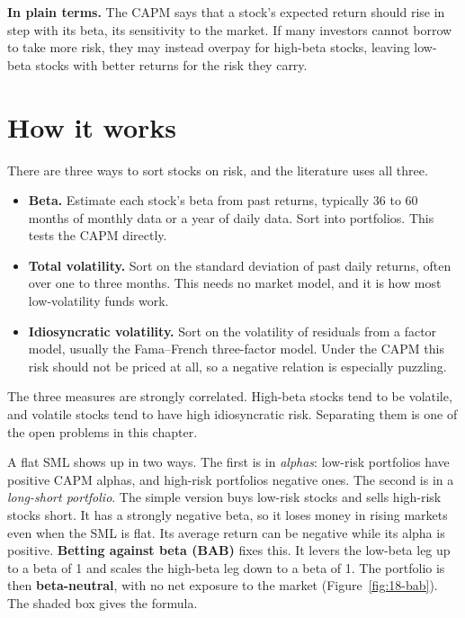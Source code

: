 \noindent\textbf{In plain terms.} The CAPM says that a stock's expected return should rise in step with its beta, its sensitivity to the market. If many investors cannot borrow to take more risk, they may instead overpay for high-beta stocks, leaving low-beta stocks with better returns for the risk they carry.

\section{How it works}
\label{sec:18-how}

There are three ways to sort stocks on risk, and the literature uses all three.

\begin{itemize}
  \item \textbf{Beta.} Estimate each stock's beta from past returns, typically 36 to 60 months of monthly data or a year of daily data. Sort into portfolios. This tests the CAPM directly.
  \item \textbf{Total volatility.} Sort on the standard deviation of past daily returns, often over one to three months. This needs no market model, and it is how most low-volatility funds work.
  \item \textbf{Idiosyncratic volatility.} Sort on the volatility of residuals from a factor model, usually the Fama--French three-factor model. Under the CAPM this risk should not be priced at all, so a negative relation is especially puzzling.
\end{itemize}

The three measures are strongly correlated. High-beta stocks tend to be volatile, and volatile stocks tend to have high idiosyncratic risk. Separating them is one of the open problems in this chapter.

A flat SML shows up in two ways. The first is in \emph{alphas}: low-risk portfolios have positive CAPM alphas, and high-risk portfolios negative ones. The second is in a \emph{long-short portfolio}. The simple version buys low-risk stocks and sells high-risk stocks short. It has a strongly negative beta, so it loses money in rising markets even when the SML is flat. Its average return can be negative while its alpha is positive. \textbf{Betting against beta (BAB)} fixes this. It levers the low-beta leg up to a beta of 1 and scales the high-beta leg down to a beta of 1. The portfolio is then \textbf{beta-neutral}, with no net exposure to the market (Figure~\ref{fig:18-bab}). The shaded box gives the formula.

